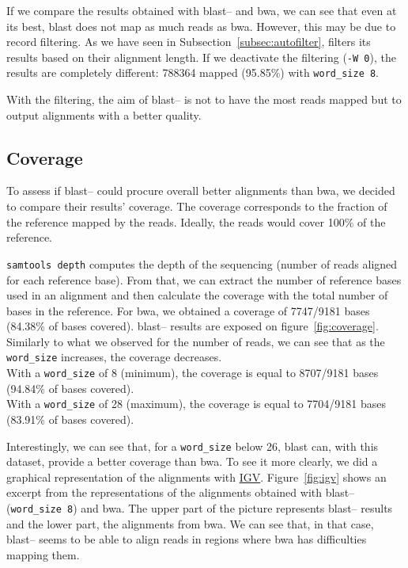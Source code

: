 If we compare the results obtained with \gls{blast}--\blastobam{} and \gls{bwa}, we can see that even at its best, \gls{blast} does not map as much reads as \gls{bwa}.
However, this may be due to \blastobam{} record filtering. As we have seen in Subsection~\ref{subsec:autofilter}, \blastobam{} filters its results based on their alignment length.
If we deactivate the filtering (\texttt{-W 0}), the results are completely different: 788364 mapped (95.85\%) with \texttt{word\_size~8}.

With the filtering, the aim of \gls{blast}--\blastobam{} is not to have the most reads mapped but to output alignments with a better quality.
\pagebreak

\subsection{Coverage}
To assess if \gls{blast}--\blastobam{} could procure overall better alignments than \gls{bwa}, we decided to compare their results' coverage.
The coverage corresponds to the fraction of the reference mapped by the reads.
Ideally, the reads would cover 100\% of the reference.

\texttt{samtools depth} computes the depth of the sequencing (number of reads aligned for each reference base).
From that, we can extract the number of reference bases used in an alignment and then calculate the coverage with the total number of bases in the reference.
For \gls{bwa}, we obtained a coverage of 7747\slash\hspace{0pt}9181 bases (84.38\% of bases covered).
\gls{blast}--\blastobam{} results are exposed on figure~\ref{fig:coverage}.
Similarly to what we observed for the number of reads, we can see that as the \texttt{word\_size} increases, the coverage decreases.\\
With a \texttt{word\_size} of 8 (minimum), the coverage is equal to 8707\slash\hspace{0pt}9181 bases (94.84\% of bases covered).\\
With a \texttt{word\_size} of 28 (maximum), the coverage is equal to 7704\slash\hspace{0pt}9181 bases (83.91\% of bases covered).

Interestingly, we can see that, for a \texttt{word\_size} below 26, \gls{blast} can, with this dataset, provide a better coverage than \gls{bwa}.
To see it more clearly, we did a graphical representation of the alignments with \href{https://www.broadinstitute.org/igv/}{IGV}.
Figure~\ref{fig:igv} shows an excerpt from the representations of the alignments obtained with \gls{blast}--\blastobam{} (\texttt{word\_size~8}) and \gls{bwa}.
The upper part of the picture represents \gls{blast}--\blastobam{} results and the lower part, the alignments from \gls{bwa}.
We can see that, in that case, \gls{blast}--\blastobam{} seems to be able to align reads in regions where \gls{bwa} has difficulties mapping them.

